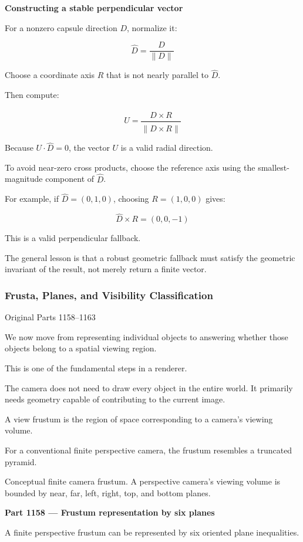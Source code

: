 \textbf{Constructing a stable perpendicular vector}

For a nonzero capsule direction \(D\), normalize it:

\[
\hat D=\frac{D}{\|D\|}
\]

Choose a coordinate axis \(R\) that is not nearly parallel to \(\hat D\).

Then compute:

\[
U=\frac{\hat D\times R}{\|\hat D\times R\|}
\]

Because \(U\cdot\hat D=0\), the vector \(U\) is a valid radial direction.

To avoid near-zero cross products, choose the reference axis using the smallest-magnitude component of \(\hat D\).

For example, if \(\hat D=(0,1,0)\), choosing \(R=(1,0,0)\) gives:

\[
\hat D\times R=(0,0,-1)
\]

This is a valid perpendicular fallback.

The general lesson is that a robust geometric fallback must satisfy the geometric invariant of the result, not merely return a finite vector.

\subsubsection{Frusta, Planes, and Visibility Classification}\label{frusta-planes-and-visibility-classification}

Original Parts 1158--1163

We now move from representing individual objects to answering whether those objects belong to a spatial viewing region.

This is one of the fundamental steps in a renderer.

The camera does not need to draw every object in the entire world. It primarily needs geometry capable of contributing to the current image.

A view frustum is the region of space corresponding to a camera's viewing volume.

For a conventional finite perspective camera, the frustum resembles a truncated pyramid.

Conceptual finite camera frustum. A perspective camera's viewing volume is bounded by near, far, left, right, top, and bottom planes.

\textbf{Part 1158 --- Frustum representation by six planes}

A finite perspective frustum can be represented by six oriented plane inequalities.

